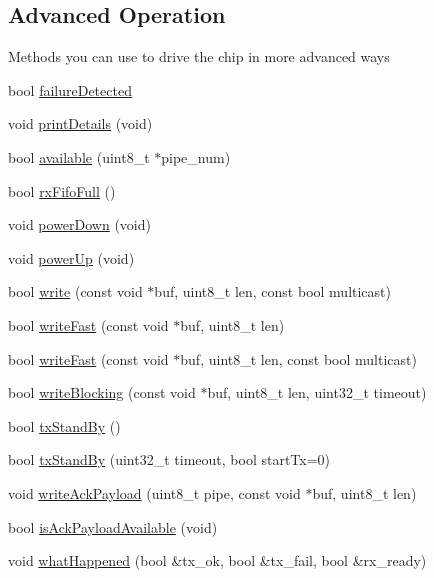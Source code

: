 \subsection*{Advanced Operation}
\label{_amgrpaf32cf1216e734b82e2b52429dae0bf6}%
 Methods you can use to drive the chip in more advanced ways \begin{DoxyCompactItemize}
\item 
bool \hyperlink{classRF24_a2e40fe66d1231a333aa2534e8491f828}{failure\+Detected}
\item 
void \hyperlink{classRF24_adc95213ed4c8569a90eb33122e16cea6}{print\+Details} (void)
\item 
bool \hyperlink{classRF24_ace7dd139fabc16b77cb8325faa07620f}{available} (uint8\+\_\+t $\ast$pipe\+\_\+num)
\item 
bool \hyperlink{classRF24_ad22e44fe1a68747872fcb304a407fd30}{rx\+Fifo\+Full} ()
\item 
void \hyperlink{classRF24_aa0a51923a09ba4f3478aba9be0f8a6a1}{power\+Down} (void)
\item 
void \hyperlink{classRF24_a5cdaf47aa0edd6dca1b9a8bb7972a1a3}{power\+Up} (void)
\item 
bool \hyperlink{classRF24_a23bfe6502d74bb5bbccb3a7f2ba2b5ea}{write} (const void $\ast$buf, uint8\+\_\+t len, const bool multicast)
\item 
bool \hyperlink{classRF24_a47b2516993481b58e724d1274a7fd9cb}{write\+Fast} (const void $\ast$buf, uint8\+\_\+t len)
\item 
bool \hyperlink{classRF24_ad16d53de0327c0b41d170cbda4bf41af}{write\+Fast} (const void $\ast$buf, uint8\+\_\+t len, const bool multicast)
\item 
bool \hyperlink{classRF24_ae6fd8d5ee490d54ae1cb2e8fefee535f}{write\+Blocking} (const void $\ast$buf, uint8\+\_\+t len, uint32\+\_\+t timeout)
\item 
bool \hyperlink{classRF24_a12cc453453c94969d4d3f0edb3778c83}{tx\+Stand\+By} ()
\item 
bool \hyperlink{classRF24_ab7f54decbe9d06cb026a5d3dfb505116}{tx\+Stand\+By} (uint32\+\_\+t timeout, bool start\+Tx=0)
\item 
void \hyperlink{classRF24_a65619238c25036c3de72dc2c1a1c6e52}{write\+Ack\+Payload} (uint8\+\_\+t pipe, const void $\ast$buf, uint8\+\_\+t len)
\item 
bool \hyperlink{classRF24_a30c2736fd0df9c8128cef408c8b88e92}{is\+Ack\+Payload\+Available} (void)
\item 
void \hyperlink{classRF24_afb97dc4bdf4d2d84ea44060ac5b4ed89}{what\+Happened} (bool \&tx\+\_\+ok, bool \&tx\+\_\+fail, bool \&rx\+\_\+ready)

\end{DoxyCompactItemize}
